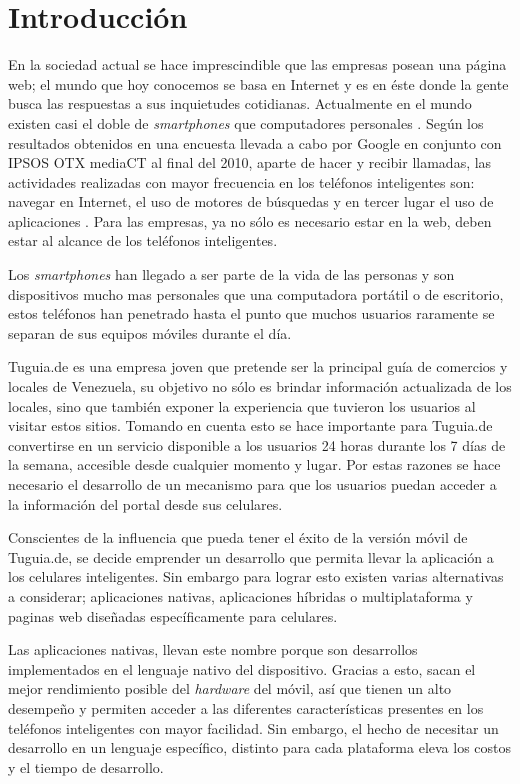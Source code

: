 \chapter{Introducción}


En la sociedad actual se hace imprescindible que las empresas posean una página web; el mundo que hoy conocemos se basa en Internet y es en éste donde la gente busca las respuestas a sus inquietudes cotidianas. Actualmente en el mundo existen casi el doble de \textit{smartphones} que computadores personales \cite{DGT}. Según los resultados obtenidos en una encuesta llevada a cabo por Google en conjunto con IPSOS OTX mediaCT al final del 2010, aparte de hacer y recibir llamadas, las actividades realizadas con mayor frecuencia en los teléfonos inteligentes son: navegar en Internet, el uso de motores de búsquedas y en tercer lugar el uso de aplicaciones \cite{TMM}. Para las empresas, ya no sólo es necesario estar en la web, deben estar al alcance de los teléfonos inteligentes.

Los \textit{smartphones} han llegado a ser parte de la vida de las personas y son dispositivos mucho mas personales que una computadora portátil o de escritorio, estos teléfonos han penetrado hasta el punto que muchos usuarios raramente se separan de sus equipos móviles durante el día.

Tuguia.de es una empresa joven que pretende ser la principal guía de comercios y locales de Venezuela, su objetivo no sólo es brindar información actualizada de los locales, sino que también exponer la experiencia que tuvieron los usuarios al visitar estos sitios. Tomando en cuenta esto se hace importante para Tuguia.de convertirse en un servicio disponible a los usuarios 24 horas durante los 7 días de la semana, accesible desde cualquier momento y lugar. Por estas razones se hace necesario el desarrollo de un mecanismo para que los usuarios puedan acceder a la información del portal desde sus celulares.

Conscientes de la influencia que pueda tener el éxito de la versión móvil de Tuguia.de, se decide emprender un desarrollo que permita llevar la aplicación a los celulares inteligentes.  Sin embargo para lograr esto existen varias alternativas a considerar; aplicaciones nativas, aplicaciones híbridas o multiplataforma y paginas web diseñadas específicamente para celulares.

Las aplicaciones nativas, llevan este nombre porque son desarrollos implementados en el lenguaje nativo del dispositivo. Gracias a esto, sacan el mejor rendimiento posible del \textit{hardware} del móvil, así que tienen un alto desempeño y permiten acceder a las diferentes características presentes en los teléfonos inteligentes con mayor facilidad. Sin embargo, el hecho de necesitar un desarrollo en un lenguaje específico, distinto para cada plataforma eleva los costos y el tiempo de desarrollo. 

